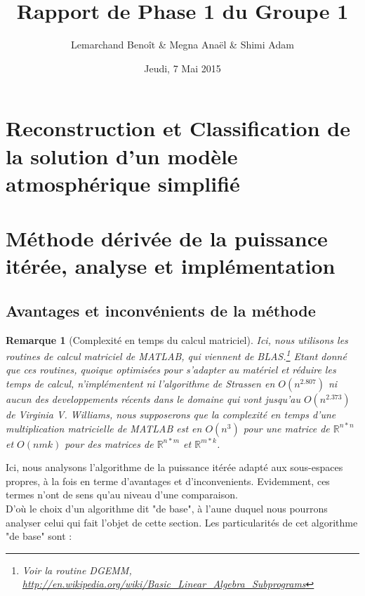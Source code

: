 \documentclass[a4paper,12pt]{article}
\title{\Huge\textbf{Rapport de Phase 1 du Groupe 1}}
\author{Lemarchand Benoît \& Megna Anaël \& Shimi Adam}
\date{Jeudi, 7 Mai 2015}
\newtheorem*{remark}{Remarque}
\begin{document}
\begin{titlepage}
  \maketitle
  \thispagestyle{empty}
  \tableofcontents
\end{titlepage}

\section{Reconstruction et Classification de la solution d'un modèle
atmosphérique simplifié}

\section{Méthode dérivée de la puissance itérée, analyse et implémentation}

    \subsection{Avantages et inconvénients de la méthode}

    \begin{remark}[Complexité en temps du calcul matriciel]
    Ici, nous utilisons les routines de calcul matriciel de MATLAB, qui viennent de BLAS.\footnote{Voir la routine DGEMM, \url{http://en.wikipedia.org/wiki/Basic_Linear_Algebra_Subprograms}} Etant donné que ces routines, quoique optimisées pour s'adapter au matériel et réduire les temps de calcul, n'implémentent ni l'algorithme de Strassen en $O(n^{2.807})$ ni aucun des developpements récents dans le domaine qui vont jusqu'au $O(n^{2.373})$ de Virginia V. Williams, nous supposerons que la complexité en temps d'une multiplication matricielle de MATLAB est en $O(n^3)$ pour une matrice de $\mathbb{R}^{n*n}$ et $O(nmk)$ pour des matrices de $\mathbb{R}^{n*m}$ et $\mathbb{R}^{m*k}$.
    \end{remark}

    Ici, nous analysons l'algorithme de la puissance itérée adapté aux sous-espaces propres, à la fois en terme d'avantages et d'inconvenients. Evidemment, ces termes n'ont de sens qu'au niveau d'une comparaison. \\
    D'où le choix d'un algorithme dit "de base", à l'aune duquel nous pourrons analyser celui qui fait l'objet de cette section.
    Les particularités de cet algorithme "de base" sont : \\
\end{document}

